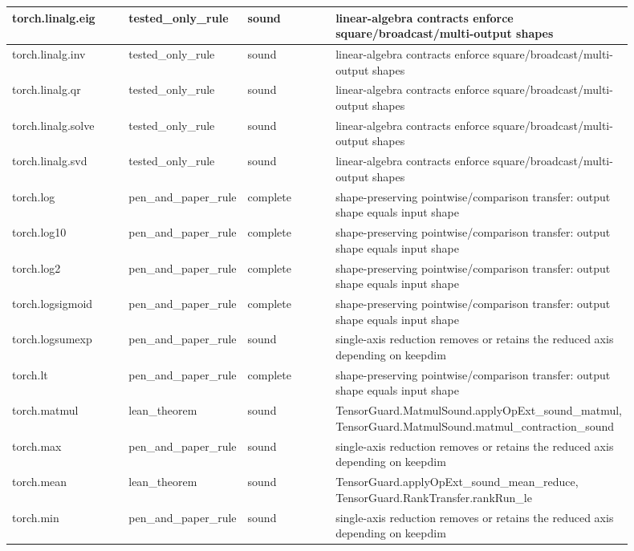 \documentclass[10pt]{article}
\begin{document}
\begin{longtable}{|p{0.20\linewidth}|p{0.18\linewidth}|p{0.16\linewidth}|p{0.36\linewidth}|}
\hline
torch.linalg.eig & tested\_only\_rule & sound & linear-algebra contracts enforce square/broadcast/multi-output shapes \\
\hline
torch.linalg.inv & tested\_only\_rule & sound & linear-algebra contracts enforce square/broadcast/multi-output shapes \\
\hline
torch.linalg.qr & tested\_only\_rule & sound & linear-algebra contracts enforce square/broadcast/multi-output shapes \\
\hline
torch.linalg.solve & tested\_only\_rule & sound & linear-algebra contracts enforce square/broadcast/multi-output shapes \\
\hline
torch.linalg.svd & tested\_only\_rule & sound & linear-algebra contracts enforce square/broadcast/multi-output shapes \\
\hline
torch.log & pen\_and\_paper\_rule & complete & shape-preserving pointwise/comparison transfer: output shape equals input shape \\
\hline
torch.log10 & pen\_and\_paper\_rule & complete & shape-preserving pointwise/comparison transfer: output shape equals input shape \\
\hline
torch.log2 & pen\_and\_paper\_rule & complete & shape-preserving pointwise/comparison transfer: output shape equals input shape \\
\hline
torch.logsigmoid & pen\_and\_paper\_rule & complete & shape-preserving pointwise/comparison transfer: output shape equals input shape \\
\hline
torch.logsumexp & pen\_and\_paper\_rule & sound & single-axis reduction removes or retains the reduced axis depending on keepdim \\
\hline
torch.lt & pen\_and\_paper\_rule & complete & shape-preserving pointwise/comparison transfer: output shape equals input shape \\
\hline
torch.matmul & lean\_theorem & sound & TensorGuard.MatmulSound.applyOpExt\_sound\_matmul, TensorGuard.MatmulSound.matmul\_contraction\_sound \\
\hline
torch.max & pen\_and\_paper\_rule & sound & single-axis reduction removes or retains the reduced axis depending on keepdim \\
\hline
torch.mean & lean\_theorem & sound & TensorGuard.applyOpExt\_sound\_mean\_reduce, TensorGuard.RankTransfer.rankRun\_le \\
\hline
torch.min & pen\_and\_paper\_rule & sound & single-axis reduction removes or retains the reduced axis depending on keepdim \\

\end{longtable}
\end{document}
